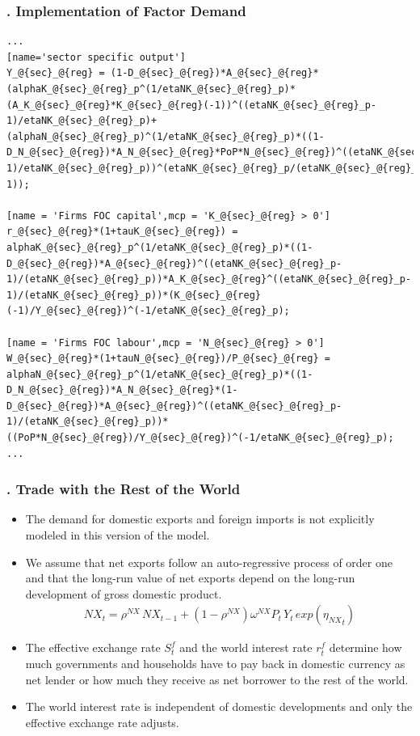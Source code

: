 \documentclass[11pt,aspectratio=169]{beamer}
\begin{document}
\begin{frame}[fragile]
\frametitle{{\thesection.\thesubsection} Implementation of Factor Demand}

\begin{lstlisting}[frame = single]
...
[name='sector specific output']
Y_@{sec}_@{reg} = (1-D_@{sec}_@{reg})*A_@{sec}_@{reg}*(alphaK_@{sec}_@{reg}_p^(1/etaNK_@{sec}_@{reg}_p)*(A_K_@{sec}_@{reg}*K_@{sec}_@{reg}(-1))^((etaNK_@{sec}_@{reg}_p-1)/etaNK_@{sec}_@{reg}_p)+(alphaN_@{sec}_@{reg}_p)^(1/etaNK_@{sec}_@{reg}_p)*((1-D_N_@{sec}_@{reg})*A_N_@{sec}_@{reg}*PoP*N_@{sec}_@{reg})^((etaNK_@{sec}_@{reg}_p-1)/etaNK_@{sec}_@{reg}_p))^(etaNK_@{sec}_@{reg}_p/(etaNK_@{sec}_@{reg}_p-1));

[name = 'Firms FOC capital',mcp = 'K_@{sec}_@{reg} > 0']
r_@{sec}_@{reg}*(1+tauK_@{sec}_@{reg}) = alphaK_@{sec}_@{reg}_p^(1/etaNK_@{sec}_@{reg}_p)*((1-D_@{sec}_@{reg})*A_@{sec}_@{reg})^((etaNK_@{sec}_@{reg}_p-1)/(etaNK_@{sec}_@{reg}_p))*A_K_@{sec}_@{reg}^((etaNK_@{sec}_@{reg}_p-1)/(etaNK_@{sec}_@{reg}_p))*(K_@{sec}_@{reg}(-1)/Y_@{sec}_@{reg})^(-1/etaNK_@{sec}_@{reg}_p);

[name = 'Firms FOC labour',mcp = 'N_@{sec}_@{reg} > 0']
W_@{sec}_@{reg}*(1+tauN_@{sec}_@{reg})/P_@{sec}_@{reg} = alphaN_@{sec}_@{reg}_p^(1/etaNK_@{sec}_@{reg}_p)*((1-D_N_@{sec}_@{reg})*A_N_@{sec}_@{reg}*(1-D_@{sec}_@{reg})*A_@{sec}_@{reg})^((etaNK_@{sec}_@{reg}_p-1)/(etaNK_@{sec}_@{reg}_p))*((PoP*N_@{sec}_@{reg})/Y_@{sec}_@{reg})^(-1/etaNK_@{sec}_@{reg}_p);
...
\end{lstlisting}
\end{frame}



\begin{frame}
\frametitle{{\thesection.\thesubsection} Trade with the Rest of the World}
\scriptsize
\begin{itemize}
\item The demand for domestic exports and foreign imports is not explicitly modeled in this version of the model. 
\item We assume that net exports follow an auto-regressive process of order one and that the long-run value of net exports depend on the long-run development of gross domestic product.
\begin{align*}
NX_{t} = \rho^{NX} \, NX_{t-1} + (1 - \rho^{NX}) \omega^{NX} P_{t} \, Y_{t} \, exp\left({{\eta_{NX}}_{t}}\right)
\end{align*}
\item The effective exchange rate $S^f_{t}$ and the world interest rate $r^{f}_{t}$ determine how much governments and households have to pay back in domestic currency as net lender or how much they receive as net borrower to the rest of the world.
 \item The world interest rate is independent of domestic developments and only the effective exchange rate adjusts.
\end{itemize}
\end{frame}
\end{document}
